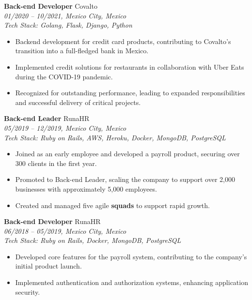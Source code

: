 \documentclass[a4paper,10pt]{article}
\begin{document}
\textbf{Back-end Developer } \hfill Covalto \\
\textit{01/2020 -- 10/2021, Mexico City, Mexico} \\
\textit{Tech Stack: Golang, Flask, Django, Python} \\
\begin{itemize}[leftmargin=0.5cm]
    \item Backend development for credit card products, contributing to Covalto’s transition into a full-fledged bank in Mexico.
    \item Implemented credit solutions for restaurants in collaboration with Uber Eats during the COVID-19 pandemic.
    \item Recognized for outstanding performance, leading to expanded responsibilities and successful delivery of critical projects.
\end{itemize}

\textbf{Back-end Leader} \hfill RunaHR \\
\textit{05/2019 -- 12/2019, Mexico City, Mexico} \\
\textit{Tech Stack: Ruby on Rails, AWS, Heroku, Docker, MongoDB, PostgreSQL} \\
\begin{itemize}[leftmargin=0.5cm]
    \item Joined as an early employee and developed a payroll product, securing over 300 clients in the first year.
    \item Promoted to Back-end Leader, scaling the company to support over 2,000 businesses with approximately 5,000 employees.
    \item Created and managed five agile \textbf{squads} to support rapid growth.
\end{itemize}

\textbf{Back-end Developer} \hfill RunaHR \\
\textit{06/2018 -- 05/2019, Mexico City, Mexico} \\
\textit{Tech Stack: Ruby on Rails, Docker, MongoDB, PostgreSQL} \\
\begin{itemize}[leftmargin=0.5cm]
    \item Developed core features for the payroll system, contributing to the company's initial product launch.
    \item Implemented authentication and authorization systems, enhancing application security.
\end{itemize}
\end{document}
